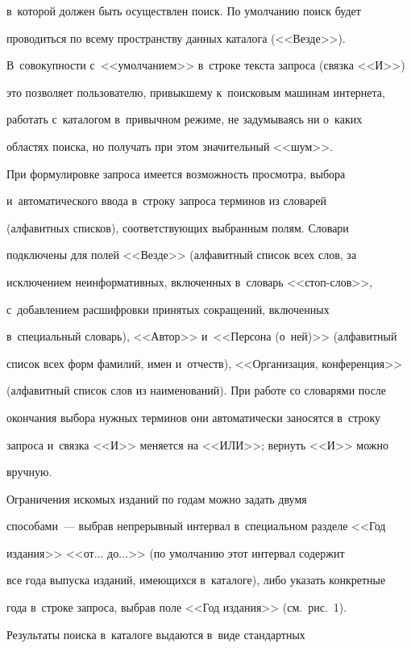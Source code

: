 в~которой должен быть осуществлен поиск. По умолчанию поиск будет 

проводиться по всему пространству данных каталога (<<Везде>>). 

В~совокупности с~<<умолчанием>> в~строке текста запроса (связка <<И>>) 

это позволяет пользователю, привыкшему к~поисковым машинам интернета, 

работать с~каталогом в~привычном режиме, не задумываясь ни о~каких 

областях поиска, но получать при этом значительный <<шум>>.

  

  При формулировке запроса имеется возможность просмотра, выбора 

и~автоматического ввода в~строку запроса терминов из словарей 

(алфавитных списков), соответствующих выбранным полям. Словари 

подключены для полей <<Везде>> (алфавитный список всех слов, за 

исключением неинформативных, включенных в~словарь <<стоп-слов>>, 

с~добавлением расшифровки принятых сокращений, включенных 

в~специальный словарь), <<Автор>> и~<<Персона (о~ней)>> (алфавитный 

список всех форм фамилий, имен и~отчеств), <<Организация, конференция>> 

(алфавитный список слов из наименований). При работе со словарями после 

окончания выбора нужных терминов они автоматически заносятся в~строку 

запроса и~связка <<И>> меняется на <<ИЛИ>>; вернуть <<И>> можно 

вручную.

  

  Ограничения искомых изданий по годам можно задать двумя  

способами~--- выбрав непрерывный интервал в~специальном разделе <<Год 

издания>> <<от$\ldots$ до$\ldots$>> (по умолчанию этот интервал содержит 

все года выпуска изданий, име\-ющих\-ся в~каталоге), либо указать конкретные 

года в~строке запроса, выбрав поле <<Год издания>> (см.\ рис.~1).

  

  Результаты поиска в~каталоге выдаются в~виде стандартных 

